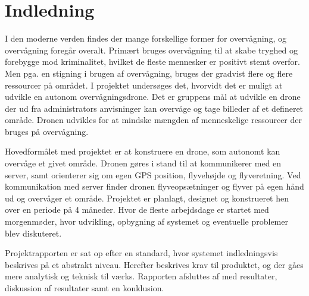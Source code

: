 \chapter{Indledning}
\label{chap:indledning}

I den moderne verden findes der mange forskellige former for overvågning, og overvågning foregår overalt. Primært bruges overvågning til at skabe tryghed og forebygge mod kriminalitet, hvilket de fleste mennesker er positivt stemt overfor. Men pga. en stigning i brugen af overvågning, bruges der gradvist flere og flere ressourcer på området. 
I projektet undersøges det, hvorvidt det er muligt at udvikle en autonom overvågningsdrone. Det er gruppens mål at udvikle en drone der ud fra administrators anvisninger kan overvåge og tage billeder af et defineret område. Dronen udvikles for at mindske mængden af menneskelige ressourcer der bruges på overvågning.

Hovedformålet med projektet er at konstruere en drone, som autonomt kan overvåge et givet område. Dronen gøres i stand til at kommunikerer med en server, samt orienterer sig om egen GPS position, flyvehøjde og flyveretning. Ved kommunikation med server finder dronen flyveopsætninger og flyver på egen hånd ud og overvåger et område.
Projektet er planlagt, designet og konstrueret hen over en periode på 4 måneder. Hvor de fleste arbejdsdage er startet med morgenmøder, hvor udvikling, opbygning af systemet og eventuelle problemer blev diskuteret. 

Projektrapporten er sat op efter en standard, hvor systemet indledningsvis beskrives på et abstrakt niveau. Herefter beskrives krav til produktet, og der gåes mere analytisk og teknisk til værks. Rapporten afsluttes af med resultater, diskussion af resultater samt en konklusion.



